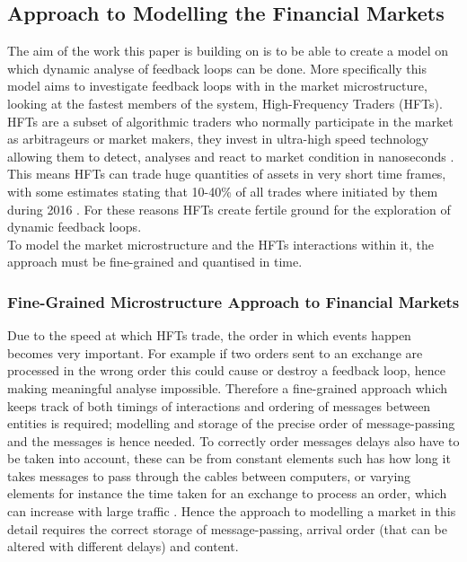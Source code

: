\documentclass{article}
\begin{document}
\subsection{Approach to Modelling the Financial Markets}

The aim of the work this paper is building on is to be able to create a model on which dynamic analyse of feedback loops can be done. More specifically this model aims to investigate feedback loops with in the market microstructure, looking at the fastest members of the system, High-Frequency Traders (HFTs).\\
HFTs are a subset of algorithmic traders who normally participate in the market as arbitrageurs or market makers, they invest in ultra-high speed technology allowing them to detect, analyses and react to market condition in nanoseconds \cite{hftinformation1}. This means HFTs can trade huge quantities of assets in very short time frames, with some estimates stating that 10-40\% of all trades where initiated by them during 2016 \cite{hftmarketparticipation}. For these reasons HFTs create fertile ground for the exploration of dynamic feedback loops.\\
To model the market microstructure and the HFTs interactions within it, the approach must be fine-grained and quantised in time.   

	
\subsubsection{Fine-Grained Microstructure Approach to Financial Markets} 

Due to the speed at which HFTs trade, the order in which events happen becomes very important. For example if two orders sent to an exchange are processed in the wrong order this could cause or destroy a feedback loop, hence making meaningful analyse impossible. Therefore a fine-grained approach which keeps track of both timings of interactions and ordering of messages between entities is required; modelling and storage of the precise order of message-passing and the messages is hence needed. To correctly order messages delays also have to be taken into account, these can be from constant elements such has how long it takes messages to pass through the cables between computers, or varying elements for instance the time taken for an exchange to process an order, which can increase with large traffic \cite{SECreport_delays}. Hence the approach to modelling a market in this detail requires the correct storage of message-passing, arrival order (that can be altered with different delays) and content.
\end{document}
